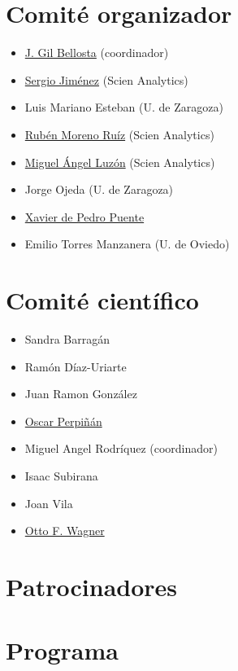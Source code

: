 \chapter{Comité organizador}

\begin{itemize}

\item \href{http://www.datanalytics.com}{J. Gil Bellosta} (coordinador)
\item \href{http://www.scien-analytics.com}{Sergio Jiménez} (Scien Analytics)
\item Luis Mariano Esteban (U. de Zaragoza)
\item \href{http://www.scien-analytics.com}{Rubén Moreno Ruíz} (Scien Analytics)
\item \href{[http://www.scien-analytics.com}{Miguel Ángel Luzón} (Scien Analytics)
\item Jorge Ojeda (U. de Zaragoza)
\item \href{http://ueb.vhir.org|Vall d'Hebron Research Institute}{Xavier de Pedro Puente}
\item  Emilio Torres Manzanera (U. de Oviedo)
\end{itemize}

\chapter{Comité científico}


\begin{itemize}

\item Sandra Barragán
\item Ramón Díaz-Uriarte
\item Juan Ramon González
\item \href{http://oscarperpinan.github.io}{Oscar Perpiñán}
\item Miguel Angel Rodríquez (coordinador)
\item Isaac Subirana
\item Joan Vila
\item \href{http://www.ottofwagner.es}{Otto F. Wagner}

\end{itemize}


\chapter{Patrocinadores}



\chapter{Programa}

% 

